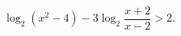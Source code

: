 \begin{ex}[type=inequality]
	\begin{condition}
		$ \log_2(x^2 - 4) - 3\log_2\dfrac{x + 2}{x - 2}>2 .$
	\end{condition}
\end{ex}